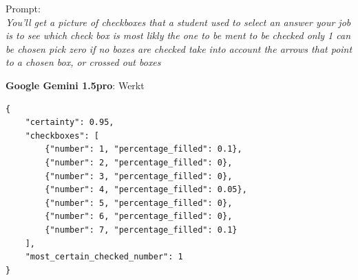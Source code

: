 \documentclass[12pt]{article}
\begin{document}
\begin{multicols}{2}
Prompt:\\
\textit{You'll get a picture of checkboxes that a student used to select an answer
    your job is to see which check box is most likly the one to be ment to be checked
    only 1 can be chosen
    pick zero if no boxes are checked 
    take into account the arrows that point to a chosen box, or crossed out boxes}


\end{multicols}
\pagebreak

\textbf{Google Gemini 1.5pro}: Werkt
\begin{listing}[H]
    
    \begin{verbatim}
{
    "certainty": 0.95, 
    "checkboxes": [
        {"number": 1, "percentage_filled": 0.1}, 
        {"number": 2, "percentage_filled": 0}, 
        {"number": 3, "percentage_filled": 0}, 
        {"number": 4, "percentage_filled": 0.05}, 
        {"number": 5, "percentage_filled": 0}, 
        {"number": 6, "percentage_filled": 0}, 
        {"number": 7, "percentage_filled": 0.1}
    ], 
    "most_certain_checked_number": 1
}
        \end{verbatim}
\end{listing}
\pagebreak
\end{document}
